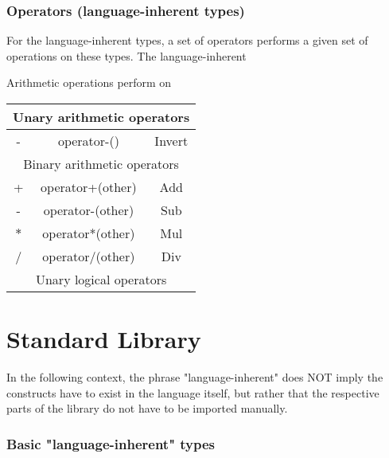 \documentclass{scrartcl}
\begin{document}
\section{Operators (language-inherent types)}


For the language-inherent types, a set of operators performs a given set of operations on these types. The language-inherent 

Arithmetic operations perform on 

\begin{table}[H]
    \centering
    \begin{tabular}{c|c|c}
    \multicolumn{3}{c}{Unary arithmetic operators} \\ \hline
        - & operator-()         & Invert \\ \hline
    \multicolumn{3}{c}{Binary arithmetic operators} \\ \hline
        + & operator+(other)    & Add \\
        - & operator-(other)    & Sub \\
        $*$ & operator*(other)  & Mul \\
        / & operator/(other)    & Div \\
    \multicolumn{3}{c}{Unary logical operators} \\ \hline
        
    \end{tabular}
\end{table}


\part{Standard Library}

In the following context, the phrase "language-inherent" does NOT imply the constructs have to exist in the language itself, but rather that the respective parts of the library do not have to be imported manually.

\section{Basic "language-inherent" types}
\end{document}
